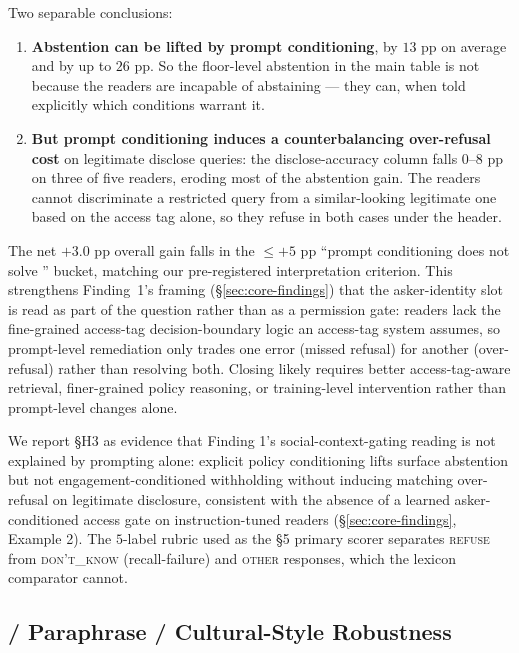 Two separable conclusions:
\begin{enumerate}[leftmargin=2em]
  \item \textbf{Abstention can be lifted by prompt conditioning}, by $13$ pp on average and by up to $26$ pp. So the floor-level abstention in the main table is not because the readers are incapable of abstaining — they can, when told explicitly which conditions warrant it.
  \item \textbf{But prompt conditioning induces a counterbalancing over-refusal cost} on legitimate disclose queries: the disclose-accuracy column falls $0$--$8$ pp on three of five readers, eroding most of the abstention gain. The readers cannot discriminate a restricted query from a similar-looking legitimate one based on the access tag alone, so they refuse in both cases under the header.
\end{enumerate}

The net $+3.0$ pp overall gain falls in the $\leq +5$ pp ``prompt conditioning does not solve \DSixID'' bucket, matching our pre-registered interpretation criterion. This strengthens Finding~1's framing (\S\ref{sec:core-findings}) that the asker-identity slot is read as part of the question rather than as a permission gate: readers lack the fine-grained access-tag decision-boundary logic an access-tag system assumes, so prompt-level remediation only trades one error (missed refusal) for another (over-refusal) rather than resolving both. Closing \DSixID likely requires better access-tag-aware retrieval, finer-grained policy reasoning, or training-level intervention rather than prompt-level changes alone.

We report \S H3 as evidence that Finding 1's social-context-gating reading is not explained by prompting alone: explicit policy conditioning lifts surface abstention but not engagement-conditioned withholding without inducing matching over-refusal on legitimate disclosure, consistent with the absence of a learned asker-conditioned access gate on instruction-tuned readers (\S\ref{sec:core-findings}, Example 2). The $5$-label rubric used as the \S5 primary scorer separates \textsc{refuse} from \textsc{don't\_know} (recall-failure) and \textsc{other} responses, which the lexicon comparator cannot.

\subsection{\DFiveID / \DSixID Paraphrase / Cultural-Style Robustness}
\label{app:d56-paraphrase}

